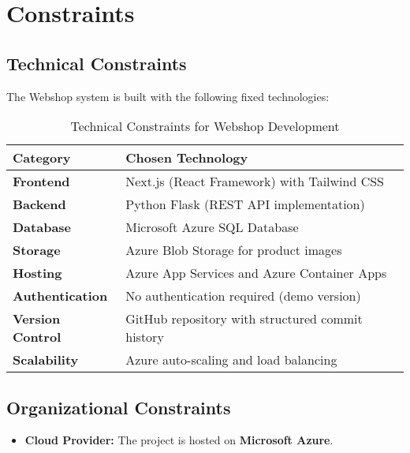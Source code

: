 \hypertarget{constraints}{%
\section{Constraints}\label{section-constraints}}

\subsection{Technical Constraints}
The Webshop system is built with the following fixed technologies:

\begin{table}[h]
\centering
\begin{tabular}{|l|l|}
\hline
\textbf{Category} & \textbf{Chosen Technology} \\ \hline
\textbf{Frontend} & Next.js (React Framework) with Tailwind CSS \\ \hline
\textbf{Backend} & Python Flask (REST API implementation) \\ \hline
\textbf{Database} & Microsoft Azure SQL Database \\ \hline
\textbf{Storage} & Azure Blob Storage for product images \\ \hline
\textbf{Hosting} & Azure App Services and Azure Container Apps \\ \hline
\textbf{Authentication} & No authentication required (demo version) \\ \hline
\textbf{Version Control} & GitHub repository with structured commit history \\ \hline
\textbf{Scalability} & Azure auto-scaling and load balancing \\ \hline
\end{tabular}
\caption{Technical Constraints for Webshop Development}
\label{tab:constraints}
\end{table}

\subsection{Organizational Constraints}
\begin{itemize}
    \item \textbf{Cloud Provider:} The project is hosted on \textbf{Microsoft Azure}.
\end{itemize}

